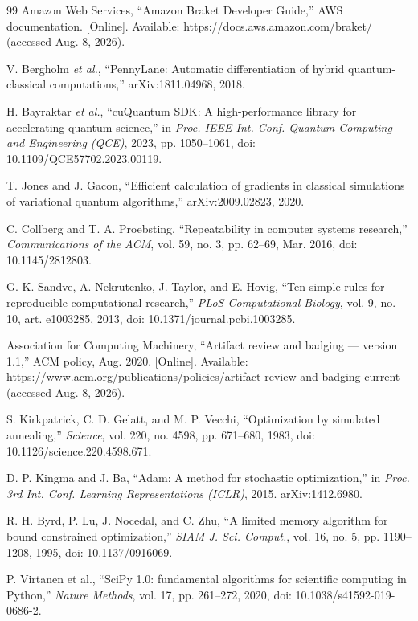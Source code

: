 \documentclass{ieeeaccess}
\begin{document}
\begin{thebibliography}{99}
 Amazon Web Services, ``Amazon Braket Developer Guide,'' AWS documentation. [Online]. Available: https://docs.aws.amazon.com/braket/ (accessed Aug. 8, 2026).

 V. Bergholm \textit{et al.}, ``PennyLane: Automatic differentiation of hybrid quantum-classical computations,'' arXiv:1811.04968, 2018.

 H. Bayraktar \textit{et al.}, ``cuQuantum SDK: A high-performance library for accelerating quantum science,'' in \textit{Proc. IEEE Int. Conf. Quantum Computing and Engineering (QCE)}, 2023, pp. 1050--1061, doi: 10.1109/QCE57702.2023.00119.

 T. Jones and J. Gacon, ``Efficient calculation of gradients in classical simulations of variational quantum algorithms,'' arXiv:2009.02823, 2020.

 C. Collberg and T. A. Proebsting, ``Repeatability in computer systems research,'' \textit{Communications of the ACM}, vol. 59, no. 3, pp. 62--69, Mar. 2016, doi: 10.1145/2812803.

 G. K. Sandve, A. Nekrutenko, J. Taylor, and E. Hovig, ``Ten simple rules for reproducible computational research,'' \textit{PLoS Computational Biology}, vol. 9, no. 10, art. e1003285, 2013, doi: 10.1371/journal.pcbi.1003285.

 Association for Computing Machinery, ``Artifact review and badging --- version 1.1,'' ACM policy, Aug. 2020. [Online]. Available: https://www.acm.org/publications/policies/artifact-review-and-badging-current (accessed Aug. 8, 2026).

 S. Kirkpatrick, C. D. Gelatt, and M. P. Vecchi, ``Optimization by simulated annealing,'' \textit{Science}, vol. 220, no. 4598, pp. 671--680, 1983, doi: 10.1126/science.220.4598.671.

 D. P. Kingma and J. Ba, ``Adam: A method for stochastic optimization,'' in \textit{Proc. 3rd Int. Conf. Learning Representations (ICLR)}, 2015. arXiv:1412.6980.

 R. H. Byrd, P. Lu, J. Nocedal, and C. Zhu, ``A limited memory algorithm for bound constrained optimization,'' \textit{SIAM J. Sci. Comput.}, vol. 16, no. 5, pp. 1190--1208, 1995, doi: 10.1137/0916069.

 P. Virtanen et al., ``SciPy 1.0: fundamental algorithms for scientific computing in Python,'' \textit{Nature Methods}, vol. 17, pp. 261--272, 2020, doi: 10.1038/s41592-019-0686-2.


\end{thebibliography}
\end{document}
